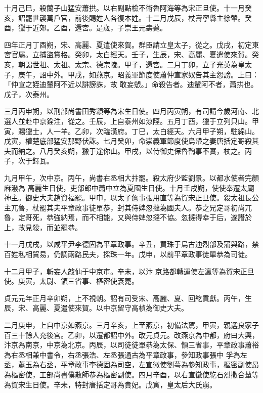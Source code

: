\begin{pinyinscope}
 十月己巳，殺蘭子山猛安蕭拱。以右副點檢不術魯阿海等為宋正旦使。十一月癸亥，詔罷世襲萬戶官，前後賜姓人各復本姓。十二月戊辰，杖壽寧縣主徐輦。癸酉，獵于近郊。乙酉，還宮。是歲，子崇王元壽薨。



 四年正月丁酉朔，宋、高麗、夏遣使來賀。群臣請立皇太子，從之。戊戌，初定東宮官屬。立捕盜賞格。癸卯，太白經天。壬子，生辰，宋、高麗、夏遣使來賀。癸亥，朝謁世祖、太祖、太宗、德宗陵。甲子，還宮。二月丁卯，立子光英為皇太子，庚午，詔中外。甲戌，如燕京。昭義軍節度使蕭仲宣家奴告其主怨謗。上曰：「仲宣之姪迪輦阿不近以誹謗誅，故
 敢妄愬。」命殺告者。迪輦阿不者，蕭拱也。戊子，次泰州。



 三月丙申朔，以刑部尚書田秀穎等為宋生日使。四月丙寅朔，有司請今歲河南、北選人並赴中京銓注，從之。壬辰，上自泰州如涼陘。五月丁酉，獵于立列只山。甲寅，賜獵士，人一羊。乙卯，次臨潢府。丁巳，太白經天。六月甲子朔，駐綿山。戊寅，權楚底部猛安那野伏誅。七月癸卯，命崇義軍節度使烏帶之妻唐括定哥殺其夫而納之。八月癸亥朔，獵于途你山。甲戌，以侍御史保魯鞫事不實，杖之。丙子，次于鐸瓦。



 九月甲午，次中京。丙午，尚書右丞相大抃罷。殺太府少監劉景。以都水使者完顏麻潑為
 高麗生日使，吏部郎中蕭中立為夏國生日使。十月壬戌朔，使使奉遷太廟神主。御史大夫趙資福罷。甲申，以太子詹事張用直等為賀宋正旦使。殺太祖長公主兀魯，杖罷其夫平章政事徒單恭，封其侍婢忽撻為國夫人。恭之兄定哥初尚兀魯，定哥死，恭強納焉，而不相能，又與侍婢忽撻不協。忽撻得幸于后，遂譖於上，故見殺，而並罷恭。



 十一月戊戌，以咸平尹李德固為平章政事。辛丑，買珠于烏古迪烈部及蒲與路，禁百姓私相貿易，仍調兩路民夫，採珠一年。戊申，以前平章政事徒單恭為司徒。



 十二月甲子，斬妄人敲仙于中京市。辛未，以汴
 京路都轉運使左瀛等為賀宋正旦使。庚寅，太尉、領三省事、樞密使袞薨。



 貞元元年正月辛卯朔，上不視朝。詔有司受宋、高麗、夏、回紇貢獻。丙午，生辰，宋、高麗、夏遣使來賀。以中京留守高楨為御史大夫。



 二月庚申，上自中京如燕京。三月辛亥，上至燕京，初備法駕，甲寅，親選良家子百三十餘人充後宮。乙卯，以遷都詔中外。改元貞元。改燕京為中都，府曰大興，汴京為南京，中京為北京。丙辰，以司徒徒單恭為太保、領三省事，平章政事蕭裕為右丞相兼中書令，右丞張浩、左丞張通古為平章政事，參知政事張中
 孚為左丞，蕭玉為右丞，平章政事李德固為司空，左宣徽使劉萼為參知政事，樞密副使昂為樞密使，工部尚書僕散師恭為樞密副使。四月辛酉，以右宣徽使紇石烈撒合輦等為賀宋生日使。辛未，特封唐括定哥為貴妃。戊寅，皇太后大氏崩。




\end{pinyinscope}
